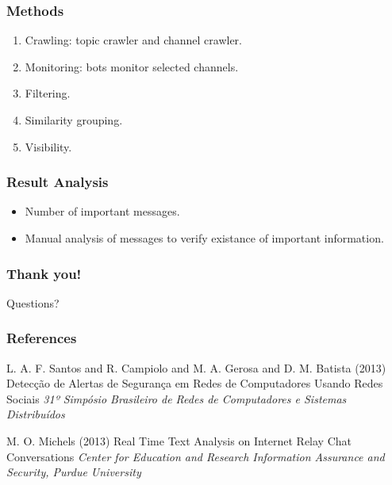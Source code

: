 \documentclass{beamer}
\begin{document}

\begin{frame}
\frametitle{Methods}

\begin{enumerate}
    \item{Crawling: topic crawler and channel crawler.}
    \item{Monitoring: bots monitor selected channels.}
    \item{Filtering.}
    \item{Similarity grouping.}
    \item{Visibility.}
\end{enumerate}

\end{frame}


\begin{frame}
\frametitle{Result Analysis}

\begin{itemize}
    \item{Number of important messages.}
    \item{Manual analysis of messages to verify existance of important information.}
\end{itemize}
\end{frame}


\begin{frame}
\frametitle{Thank you!}

\Huge{\centerline{Questions?}}
\end{frame}


\begin{frame}
\frametitle{References}
\footnotesize{
\begin{thebibliography}{99} %
 L. A. F. Santos and R. Campiolo and M. A. Gerosa and D. M. Batista (2013)
\newblock Detecção de Alertas de Segurança em Redes de Computadores Usando Redes Sociais
\newblock \emph{31º Simpósio Brasileiro de Redes de Computadores e Sistemas Distribuídos}

 M. O. Michels (2013)
\newblock Real Time Text Analysis on Internet Relay Chat Conversations
\newblock \emph{Center for Education and Research Information Assurance and Security, Purdue University}

\end{thebibliography}
}
\end{frame}

\end{document}
